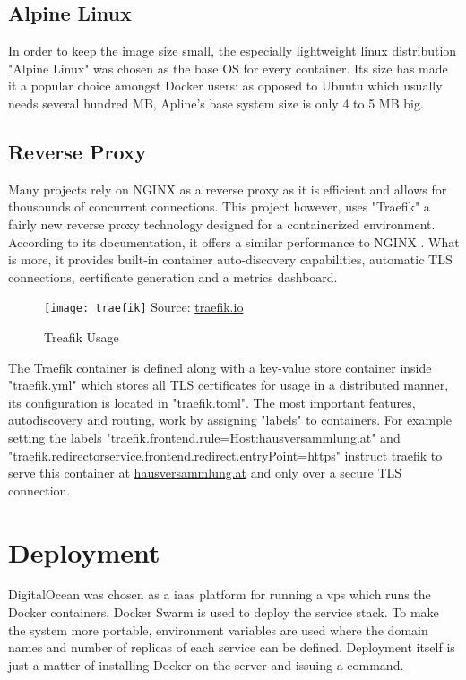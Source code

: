 \subsection{Alpine Linux}
In order to keep the image size small, the especially lightweight linux distribution "Alpine Linux" was chosen as the base OS for every container. Its size has made it a popular choice amongst Docker users: as opposed to Ubuntu which usually needs several hundred MB, Apline's base system size is only 4 to 5 MB big.

\subsection{Reverse Proxy}
Many projects rely on NGINX as a reverse proxy as it is efficient and allows for thousounds of concurrent connections. This project however, uses "Traefik" a fairly new reverse proxy technology designed for a containerized environment. According to its documentation, it offers a similar performance to NGINX \cite{TreafikBench:online}. What is more, it provides built-in container auto-discovery capabilities, automatic TLS connections, certificate generation and a metrics dashboard.

\begin{figure}[H]
    \begin{center}
    \texttt{[image: traefik]}
    Source: \href{https://traefik.io/}{traefik.io}
    \end{center}
    \caption{Treafik Usage}
    \label{fig:traefik}
\end{figure}

The Traefik container is defined along with a key-value store container inside "traefik.yml" which stores all TLS certificates for usage in a distributed manner, its configuration is located in "traefik.toml". The most important features, autodiscovery and routing, work by assigning "labels" to containers. For example setting the labels "traefik.frontend.rule=Host:hausversammlung.at" and "traefik.redirectorservice.frontend.redirect.entryPoint=https" instruct traefik to serve this container at \url{hausversammlung.at} and only over a secure TLS connection.

\section{Deployment}
DigitalOcean was chosen as a \acrfull{iaas} platform for running a \acrfull{vps} which runs the Docker containers. Docker Swarm is used to deploy the service stack. To make the system more portable, environment variables are used where the domain names and number of replicas of each service can be defined. Deployment itself is just a matter of installing Docker on the server and issuing a command.